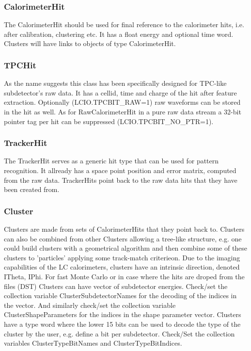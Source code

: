 \documentclass[twoside]{article}
\begin{document}
\subsubsection{CalorimeterHit}
The CalorimeterHit should be used for final reference to the calorimeter hits, i.e. after calibration, 
clustering etc. It has a float energy and optional time word. Clusters will have links to objects of type 
CalorimeterHit.

\subsubsection{TPCHit}
As the name suggests this class has been specifically designed for TPC-like subdetector's raw data.
It has a cellid, time and charge of the hit after feature extraction. Optionally (LCIO.TPCBIT\_RAW=1) raw
waveforms can be stored in the hit as well. As for RawCalorimeterHit in a pure raw data stream a 32-bit pointer tag
per hit can be suppressed (LCIO.TPCBIT\_NO\_PTR=1).

\subsubsection{TrackerHit}
The TrackerHit serves as a generic hit type that can be used for pattern recognition. It allready has a space 
point position and error matrix, computed from the raw data. TrackerHits point back to the raw data hits that they
have been created from.

\subsubsection{Cluster}
Clusters are made from sets of CalorimeterHits that they point back to. Clusters can also be combined from other
Clusters allowing a tree-like structure, e.g. one could build clusters with a geometrical algorithm and then
combine some of these clusters to 'particles' applying some track-match criterieon. Due to the imaging capabilities
of the LC calorimeters, clusters have an intrinsic direction, denoted ITheta, IPhi. For fast Monte Carlo or in case
where the hits are droped from the files (DST) Clusters can have vector of subdetector energies. Check/set the 
collection variable ClusterSubdetectorNames for the decoding of the indices in the vector.
And similarly check/set the collection variable ClusterShapeParameters for the indices in the shape parameter 
vector. Clusters have a type word where the lower 15 bits can be used to decode the type of the cluster by the
user, e.g. define a bit per subdetector. Check/Set the collection variables ClusterTypeBitNames and 
ClusterTypeBitIndices.
\end{document}
